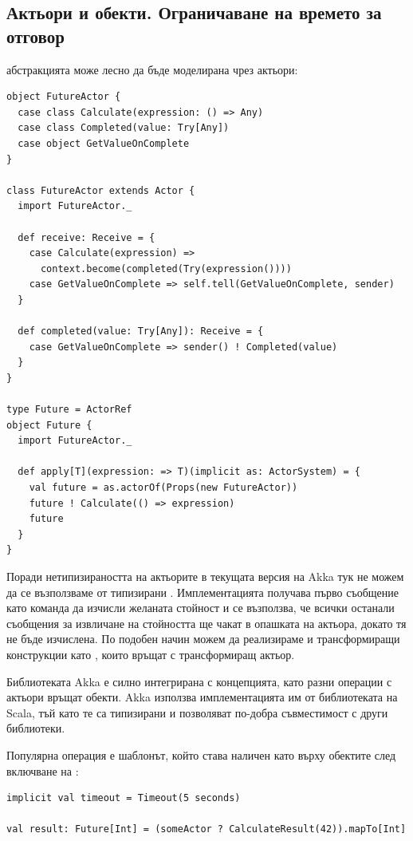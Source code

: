 \subsection{Актьори и  обекти. Ограничаване на времето за отговор}

 абстракцията може лесно да бъде моделирана чрез актьори:

\begin{lstlisting}
object FutureActor {
  case class Calculate(expression: () => Any)
  case class Completed(value: Try[Any])
  case object GetValueOnComplete
}

class FutureActor extends Actor {
  import FutureActor._
  
  def receive: Receive = {
    case Calculate(expression) =>
      context.become(completed(Try(expression())))
    case GetValueOnComplete => self.tell(GetValueOnComplete, sender)
  }
  
  def completed(value: Try[Any]): Receive = {
    case GetValueOnComplete => sender() ! Completed(value)
  }
}

type Future = ActorRef
object Future {
  import FutureActor._
  
  def apply[T](expression: => T)(implicit as: ActorSystem) = {
    val future = as.actorOf(Props(new FutureActor))
    future ! Calculate(() => expression)
    future
  }
}
\end{lstlisting}

Поради нетипизираността на актьорите в текущата версия на Akka тук не можем да се възползваме от типизирани . Имплементацията получава първо съобщение като команда да изчисли желаната стойност и се възползва, че всички останали съобщения за извличане на стойността ще чакат в опашката на актьора, докато тя не бъде изчислена. По подобен начин можем да реализираме и трансформиращи конструкции като , които връщат  с трансформиращ актьор.

Библиотеката Akka е силно интегрирана с  концепцията, като разни операции с актьори връщат  обекти. Akka използва имплементацията им от библиотеката на Scala, тъй като те са типизирани и позволяват по-добра съвместимост с други библиотеки.

Популярна операция е  шаблонът, който става наличен като  върху  обектите след включване на :

\begin{lstlisting}
implicit val timeout = Timeout(5 seconds)

val result: Future[Int] = (someActor ? CalculateResult(42)).mapTo[Int]
\end{lstlisting}

